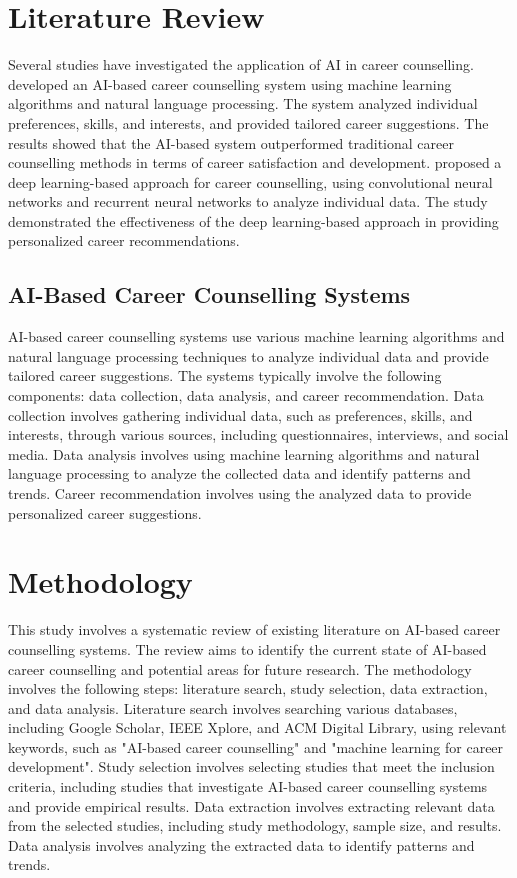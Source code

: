 \documentclass[12pt,a4paper]{article}
\begin{document}
\section{Literature Review}
Several studies have investigated the application of AI in career counselling. \citet{lee2019} developed an AI-based career counselling system using machine learning algorithms and natural language processing. The system analyzed individual preferences, skills, and interests, and provided tailored career suggestions. The results showed that the AI-based system outperformed traditional career counselling methods in terms of career satisfaction and development. \citet{kim2020} proposed a deep learning-based approach for career counselling, using convolutional neural networks and recurrent neural networks to analyze individual data. The study demonstrated the effectiveness of the deep learning-based approach in providing personalized career recommendations.

\subsection{AI-Based Career Counselling Systems}
AI-based career counselling systems use various machine learning algorithms and natural language processing techniques to analyze individual data and provide tailored career suggestions. The systems typically involve the following components: data collection, data analysis, and career recommendation. Data collection involves gathering individual data, such as preferences, skills, and interests, through various sources, including questionnaires, interviews, and social media. Data analysis involves using machine learning algorithms and natural language processing to analyze the collected data and identify patterns and trends. Career recommendation involves using the analyzed data to provide personalized career suggestions.

\section{Methodology}
This study involves a systematic review of existing literature on AI-based career counselling systems. The review aims to identify the current state of AI-based career counselling and potential areas for future research. The methodology involves the following steps: literature search, study selection, data extraction, and data analysis. Literature search involves searching various databases, including Google Scholar, IEEE Xplore, and ACM Digital Library, using relevant keywords, such as "AI-based career counselling" and "machine learning for career development". Study selection involves selecting studies that meet the inclusion criteria, including studies that investigate AI-based career counselling systems and provide empirical results. Data extraction involves extracting relevant data from the selected studies, including study methodology, sample size, and results. Data analysis involves analyzing the extracted data to identify patterns and trends.
\end{document}
